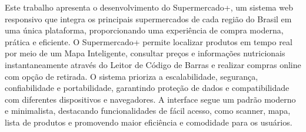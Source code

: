 \hspace{4.5mm}
Este trabalho apresenta o desenvolvimento do Supermercado+, um sistema web responsivo que integra os principais supermercados de cada região do Brasil em uma única plataforma, proporcionando uma experiência de compra moderna, prática e eficiente. O Supermercado+ permite localizar produtos em tempo real por meio de um Mapa Inteligente, consultar preços e informações nutricionais instantaneamente através do Leitor de Código de Barras e realizar compras online com opção de retirada. O sistema prioriza a escalabilidade, segurança, confiabilidade e portabilidade, garantindo proteção de dados e compatibilidade com diferentes dispositivos e navegadores. A interface segue um padrão moderno e minimalista, destacando funcionalidades de fácil acesso, como scanner, mapa, lista de produtos e promovendo maior eficiência e comodidade para os usuários. 
